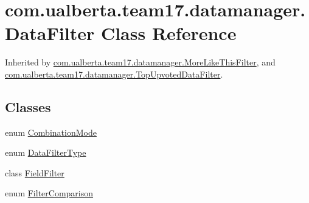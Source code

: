 \hypertarget{classcom_1_1ualberta_1_1team17_1_1datamanager_1_1_data_filter}{\section{com.\+ualberta.\+team17.\+datamanager.\+Data\+Filter Class Reference}
\label{classcom_1_1ualberta_1_1team17_1_1datamanager_1_1_data_filter}
}


Inherited by \hyperlink{classcom_1_1ualberta_1_1team17_1_1datamanager_1_1_more_like_this_filter}{com.\+ualberta.\+team17.\+datamanager.\+More\+Like\+This\+Filter}, and \hyperlink{classcom_1_1ualberta_1_1team17_1_1datamanager_1_1_top_upvoted_data_filter}{com.\+ualberta.\+team17.\+datamanager.\+Top\+Upvoted\+Data\+Filter}.

\subsection*{Classes}
\begin{DoxyCompactItemize}
\item 
enum \hyperlink{enumcom_1_1ualberta_1_1team17_1_1datamanager_1_1_data_filter_1_1_combination_mode}{Combination\+Mode}
\item 
enum \hyperlink{enumcom_1_1ualberta_1_1team17_1_1datamanager_1_1_data_filter_1_1_data_filter_type}{Data\+Filter\+Type}
\item 
class \hyperlink{classcom_1_1ualberta_1_1team17_1_1datamanager_1_1_data_filter_1_1_field_filter}{Field\+Filter}
\item 
enum \hyperlink{enumcom_1_1ualberta_1_1team17_1_1datamanager_1_1_data_filter_1_1_filter_comparison}{Filter\+Comparison}
\end{DoxyCompactItemize}
